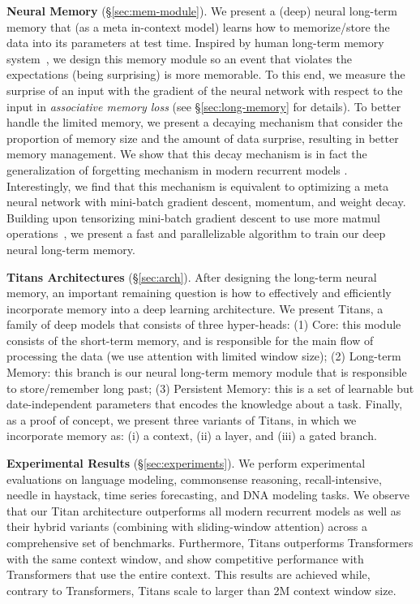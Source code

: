 \documentclass{article}
\newcommand{\citep}{\parencite}
\begin{document}
\textcolor{c3}{\textbf{Neural Memory} (\S\ref{sec:mem-module})}.
We present a (deep) neural long-term memory that (as a meta in-context model) learns how to memorize/store the data into its parameters at test time. Inspired by human long-term memory system~\citep{mandler2014structure}, we design this memory module so an event that violates the expectations (being surprising) is more memorable. To this end, we measure the surprise of an input with the gradient of the neural network with respect to the input in \emph{associative memory loss} (\textcolor{c1}{see \S}\ref{sec:long-memory} \textcolor{c1}{for details}).  To better handle the limited memory, we present a decaying mechanism that consider the proportion of memory size and the amount of data surprise, resulting in better memory management. We show that this decay mechanism is in fact the generalization of forgetting mechanism in modern recurrent models \citep{dao2024transformers, yang2024gated, gu2024mamba}. Interestingly, we find that this mechanism is equivalent to optimizing a meta neural network with mini-batch gradient descent, momentum, and weight decay. Building upon tensorizing mini-batch gradient descent to use more matmul operations~\citep{sun2024learning}, we present a fast and parallelizable algorithm to train our deep neural long-term memory.

\noindent
\textcolor{c3}{\textbf{Titans Architectures} (\S\ref{sec:arch}).}
After designing the long-term neural memory, an important remaining question is how to effectively and efficiently incorporate memory into a deep learning architecture. We present Titans, a family of deep models that consists of three hyper-heads: (1) Core: this module consists of the short-term memory, and is responsible for the main flow of processing the data (we use attention with limited window size); (2) Long-term Memory: this branch is our neural long-term memory module that is responsible to store/remember long past; (3) Persistent Memory: this is a set of learnable but date-independent parameters that encodes the knowledge about a task. Finally, as a proof of concept, we present three variants of Titans, in which we incorporate memory as: (i) a context, (ii) a layer, and (iii) a gated branch. 

\textcolor{c3}{\textbf{Experimental Results} (\S\ref{sec:experiments})}.  
We perform experimental evaluations on language modeling, commonsense reasoning, recall-intensive, needle in haystack, time series forecasting, and DNA modeling tasks. We observe that our Titan architecture outperforms all modern recurrent models as well as their hybrid variants (combining with sliding-window attention) across a comprehensive set of benchmarks. Furthermore, Titans outperforms Transformers with the same context window, and show competitive performance with Transformers that use the entire context. This results are achieved while, contrary to Transformers, Titans scale to larger than 2M context window size.  
\end{document}
